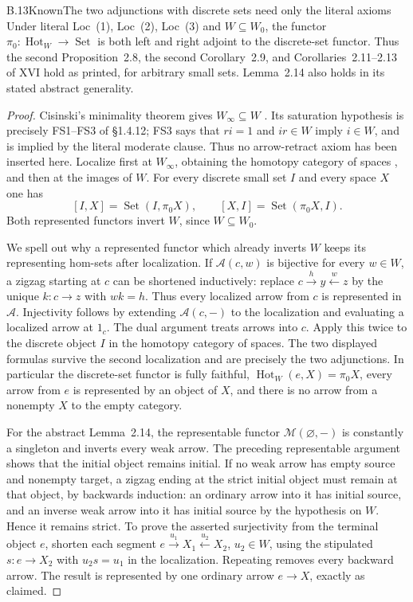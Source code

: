 \begin{claim}{B.13}{Known}{The two adjunctions with discrete sets need only the literal axioms}
Under literal Loc~(1), Loc~(2), Loc~(3) and $W\subseteq W_0$, the
functor $\pi_0:\operatorname{Hot}_W\to\operatorname{Set}$ is both
left and right adjoint to the discrete-set functor. Thus the second
Proposition~2.8, the second Corollary~2.9, and Corollaries~2.11--2.13
of XVI hold as printed, for arbitrary small sets. Lemma~2.14 also
holds in its stated abstract generality.
\end{claim}
\begin{proof}
Cisinski's minimality theorem gives $W_\infty\subseteq W$
\citep[Theorem~6.1.18]{RESCisinski2006}. Its saturation hypothesis
is precisely FS1--FS3 of \S1.4.12; FS3 says that $ri=1$ and
$ir\in W$ imply $i\in W$, and is implied by the literal moderate
clause. Thus no arrow-retract axiom has been inserted here.
Localize first at $W_\infty$, obtaining the homotopy category of
spaces \citep[Example~4.1.29]{RESCisinski2006}, and then at the
images of $W$. For every discrete small
set $I$ and every space $X$ one has
\[
 [I,X]=\operatorname{Set}(I,\pi_0X),\qquad
 [X,I]=\operatorname{Set}(\pi_0X,I).
\]
Both represented functors invert $W$, since $W\subseteq W_0$.

We spell out why a represented functor which already inverts $W$
keeps its representing hom-sets after localization. If
$\mathcal A(c,w)$ is bijective for every $w\in W$, a zigzag
starting at $c$ can be shortened inductively: replace
$c\xrightarrow h y\xleftarrow w z$ by the unique $k:c\to z$
with $wk=h$. Thus every localized arrow from $c$ is represented
in $\mathcal A$. Injectivity follows by extending
$\mathcal A(c,-)$ to the localization and evaluating a localized
arrow at $1_c$. The dual argument treats arrows into $c$.
Apply this twice to the discrete object $I$ in the homotopy category
of spaces. The two displayed formulas survive the second localization
and are precisely the two adjunctions. In particular the discrete-set
functor is fully faithful, $\operatorname{Hot}_W(e,X)=\pi_0X$,
every arrow from $e$ is represented by an object of $X$, and there
is no arrow from a nonempty $X$ to the empty category.

For the abstract Lemma~2.14, the representable functor
$\mathcal M(\varnothing,-)$ is constantly a singleton and inverts
every weak arrow. The preceding representable argument shows that
the initial object remains initial. If no weak arrow has empty source and nonempty
target, a zigzag ending at the strict initial object must remain at
that object, by backwards induction: an ordinary arrow into it has
initial source, and an inverse weak arrow into it has initial source
by the hypothesis on $W$. Hence it remains strict. To prove the
asserted surjectivity from the terminal object $e$, shorten each
segment $e\xrightarrow{u_1}X_1\xleftarrow{u_2}X_2$, $u_2\in W$,
using the stipulated $s:e\to X_2$ with $u_2s=u_1$ in the
localization. Repeating removes every backward arrow. The result
is represented by one ordinary arrow $e\to X$, exactly as claimed.
\end{proof}

